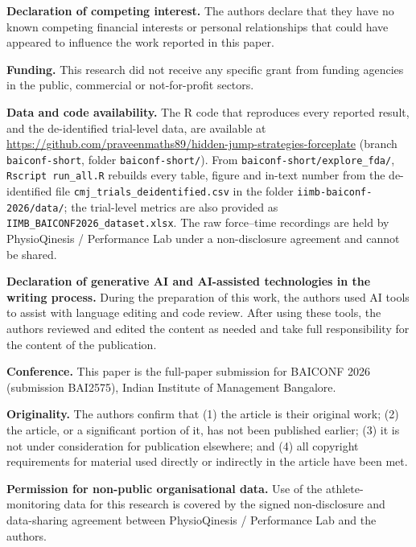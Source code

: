 \documentclass[12pt,a4paper]{article}
\begin{document}
\medskip
\noindent\textbf{Declaration of competing interest.} The authors declare that they have no known competing financial interests or personal relationships that could have appeared to influence the work reported in this paper.

\medskip
\noindent\textbf{Funding.} This research did not receive any specific grant from funding agencies in the public, commercial or not-for-profit sectors.

\medskip
\noindent\textbf{Data and code availability.} The R code that reproduces every reported result, and the de-identified trial-level data, are available at \url{https://github.com/praveenmaths89/hidden-jump-strategies-forceplate} (branch \texttt{baiconf-short}, folder \texttt{baiconf-short/}). From \texttt{baiconf-short/explore\_fda/}, \texttt{Rscript run\_all.R} rebuilds every table, figure and in-text number from the de-identified file \texttt{cmj\_trials\_deidentified.csv} in the folder \texttt{iimb-baiconf-2026/data/}; the trial-level metrics are also provided as \texttt{IIMB\_BAICONF2026\_dataset.xlsx}. The raw force--time recordings are held by PhysioQinesis / Performance Lab under a non-disclosure agreement and cannot be shared.

\medskip
\noindent\textbf{Declaration of generative AI and AI-assisted technologies in the writing process.} During the preparation of this work, the authors used AI tools to assist with language editing and code review. After using these tools, the authors reviewed and edited the content as needed and take full responsibility for the content of the publication.

\medskip
\noindent\textbf{Conference.} This paper is the full-paper submission for BAICONF 2026 (submission BAI2575), Indian Institute of Management Bangalore.

\medskip
\noindent\textbf{Originality.} The authors confirm that (1) the article is their original work; (2) the article, or a significant portion of it, has not been published earlier; (3) it is not under consideration for publication elsewhere; and (4) all copyright requirements for material used directly or indirectly in the article have been met.

\medskip
\noindent\textbf{Permission for non-public organisational data.} Use of the athlete-monitoring data for this research is covered by the signed non-disclosure and data-sharing agreement between PhysioQinesis / Performance Lab and the authors.
\end{document}
